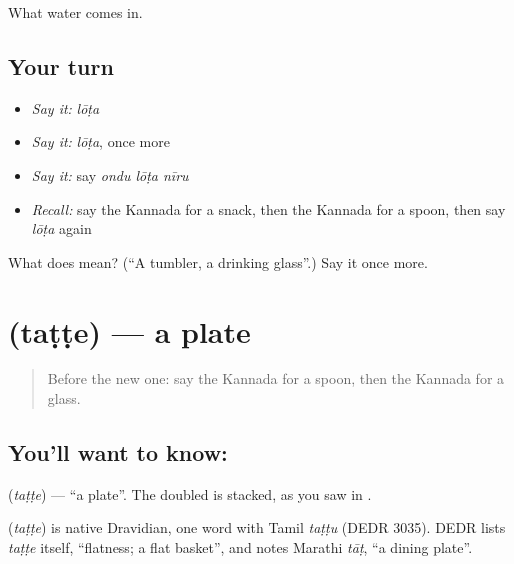 \begin{grammarlens}[title={What you've built}]
What water comes in.
\end{grammarlens}

\subsection*{Your turn}
\begin{itemize}
\raggedright
  \item \emph{Say it:} \emph{lōṭa}
  \item \emph{Say it:} \emph{lōṭa}, once more
  \item \emph{Say it:} say \emph{ondu lōṭa nīru}
  \item \emph{Recall:} say the Kannada for a snack, then the Kannada for a spoon, then say \emph{lōṭa} again
\end{itemize}

\begin{tcolorbox}[breakable,colback=teal!4,colframe=teal!35!black,title={Before you move on}]
What does  mean? (\textquotedblleft{}A tumbler, a drinking glass\textquotedblright{}.) Say it once more.
\end{tcolorbox}
\section[\texorpdfstring{\kn{ತಟ್ಟೆ} (taṭṭe)}{ತಟ್ಟೆ (taṭṭe)}]{ (taṭṭe) — a plate}

\label{lesson:KA-C94-plate}



\begin{quote}
Before the new one: say the Kannada for a spoon, then the Kannada for a glass.
\end{quote}

\subsection*{You'll want to know: }
\textbf{} (\emph{taṭṭe}) — \textquotedblleft{}a plate\textquotedblright{}. The doubled \textbf{} is stacked, as you saw in \textbf{}.

\begin{cousinweb}
\textbf{} (\emph{taṭṭe}) is native Dravidian, one word with Tamil \emph{taṭṭu} (DEDR 3035). DEDR lists \emph{taṭṭe} itself, \textquotedblleft{}flatness; a flat basket\textquotedblright{}, and notes Marathi \emph{tāṭ}, \textquotedblleft{}a dining plate\textquotedblright{}.
\end{cousinweb}

